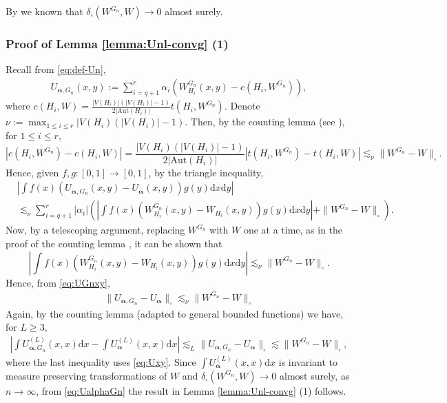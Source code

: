 \documentclass[11pt,reqno]{amsart}
\numberwithin{equation}{section}
\theoremstyle{definition}
\begin{document}
By \cite[Lemma 10.16]{lovasz2012large} we known that $\delta_{\square}(W^{G_n}, W) \rightarrow 0$ almost surely. 

\subsubsection{Proof of Lemma \ref{lemma:Unl-convg} (1)} 

Recall from \eqref{eq:def-Un}, 
\begin{align*}
    U_{\bm \alpha, G_n}(x, y) := \sum_{i=q+1}^{r}\alpha_{i}\left(W^{G_n}_{H_{i}} (x, y)  - c(H_{i},W^{G_{n}})\right) , 
\end{align*}
where $c(H_i, W) = \frac{|V(H_{i})|(|V(H_{i})| -1) }{2|\text{Aut}(H_{i})|}t(H_{i},W^{G_{n}})$. Denote $\nu:=\max_{1 \leq i \leq r} |V(H_i) (|V(H_i)| -1) $. Then, by the counting lemma (see \cite[Theorem 3.7]{borgs2008convergent}), 
for $1 \leq i \leq r$, 
$$|c(H_{i},W^{G_{n}})- c(H_{i},W)|  = \frac{|V(H_i) (|V(H_i)| -1)}{2 |\mathrm{Aut}(H_i)|} |t(H_i, W^{G_{n}}) - t(H_i, W)| \lesssim_{\nu} \| W^{G_{n}} - W \|_{\square} . $$
Hence, given $f, g: [0, 1] \rightarrow [0, 1]$, by the triangle inequality, 
\begin{align}\label{eq:UGnxy}
& \left|\int f(x) (U_{\bm \alpha, G_n}(x, y) - U_{\bm \alpha}(x, y)) g(y) \mathrm d x \mathrm d y \right| \nonumber \\ 
& \lesssim_{\nu} \sum_{i=q+1}^r |\alpha_i| \left(\left|\int f(x) (W^{G_n}_{H_{i}} (x, y) - W_{H_{i}} (x, y)) g(y) \mathrm d x \mathrm d y \right| + \| W^{G_{n}} - W \|_{\square} \right) . 
\end{align}
Now, by a telescoping argument, replacing $W^{G_n}$ with $W$ one at a time, as in the proof of the counting lemma \cite[Theorem 3.7]{borgs2008convergent}, it can be shown that 
$$\left|\int f(x) (W^{G_n}_{H_{i}} (x, y) - W_{H_{i}} (x, y)) g(y) \mathrm d x \mathrm d y \right| \lesssim_{\nu} \| W^{G_n} - W \|_{\square} . $$
Hence, from \eqref{eq:UGnxy}, 
\begin{align}\label{eq:Uxy}
\| U_{\bm \alpha, G_n} - U_{\bm \alpha}\|_{\square} \lesssim_{\nu} \| W^{G_n} - W \|_{\square}
\end{align}
Again, by the counting lemma (adapted to general bounded functions) we have, for $L \geq 3$, 
\begin{align}\label{eq:UalphaGn}
\left| \int U_{\bm \alpha, G_n}^{(L)}(x, x) \mathrm d x -  \int U_{\bm \alpha}^{(L)}(x, x) \mathrm d x \right| \lesssim_{L} \| U_{\bm \alpha, G_n} - U_{\bm \alpha}\|_{\square} \lesssim \| W^{G_n} - W\|_\square, 
\end{align}
where the last inequality uses \eqref{eq:Uxy}. Since $\int U_{\bm \alpha}^{(L)}(x, x) \mathrm d x$ is invariant to measure preserving transformations of $W$ and $\delta_{\square}(W^{G_n}, W) \rightarrow 0$ almost surely, as $n \rightarrow \infty$, from \eqref{eq:UalphaGn} the result in Lemma \ref{lemma:Unl-convg} (1) follows.
\end{document}
